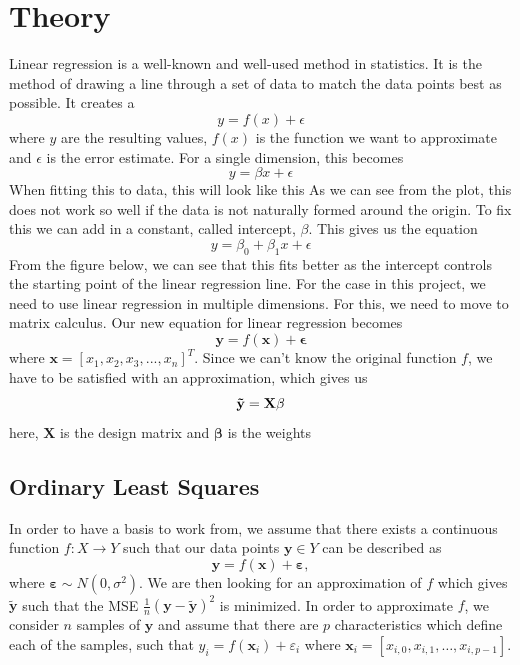 \documentclass{article}
\begin{document}
\section{Theory}
Linear regression is a well-known and well-used method in statistics. It is the method of drawing a line through a set of data to match the data points best as possible. It creates a
\begin{equation*}
    y = f(x) + \epsilon
\end{equation*}
where $y$ are the resulting values, $f(x)$ is the function we want to approximate and $\epsilon$ is the error estimate. For a single dimension, this becomes
\begin{equation*}
    y = \beta x + \epsilon
\end{equation*}
When fitting this to data, this will look like this
As we can see from the plot, this does not work so well if the data is not naturally formed around the origin. To fix this we can add in a constant, called intercept, $\beta$. This gives us the equation
\begin{equation*}
    y = \beta_0 + \beta_1x + \epsilon
\end{equation*}
From the figure below, we can see that this fits better as the intercept controls the starting point of the linear regression line.
For the case in this project, we need to use linear regression in multiple dimensions. For this, we need to move to matrix calculus. Our new equation for linear regression becomes
\begin{equation*}
    \mathbf{y} = f(\mathbf{x}) + \mathbf{\epsilon}
\end{equation*}
where $\mathbf{x} = [x_1, x_2, x_3, ..., x_n]^T$. Since we can't know the original function $f$, we have to be satisfied with an approximation, which gives us
\begin{equation*}
    \mathbf{\Tilde{y}} = \mathbf{X\beta}
\end{equation*}
here, $\mathbf{X}$ is the design matrix and $\mathbf{\beta}$ is the weights

\newpage
\subsection{Ordinary Least Squares}
In order to have a basis to work from, we assume that there exists a continuous function $f: X \to Y$ such that our data points $\boldsymbol{y} \in Y$ can be described as
\begin{equation*}
    \boldsymbol{y} = f(\boldsymbol{x}) + \boldsymbol{\varepsilon},
\end{equation*}
where $\boldsymbol{\varepsilon} \sim N(0, \sigma^2)$. We are then looking for an approximation of $f$ which gives $\tilde{\boldsymbol{y}}$ such that the MSE $\frac{1}{n} \left( \boldsymbol{y} - \tilde{\boldsymbol{y}} \right)^2$ is minimized. In order to approximate $f$, we consider $n$ samples of $\boldsymbol{y}$ and assume that there are $p$ characteristics which define each of the samples, such that $y_i = f(\boldsymbol{x}_i) + \varepsilon_i$ where $\boldsymbol{x}_i = \left[x_{i,0}, x_{i, 1}, \ldots, x_{i, p-1} \right]$.
\end{document}
